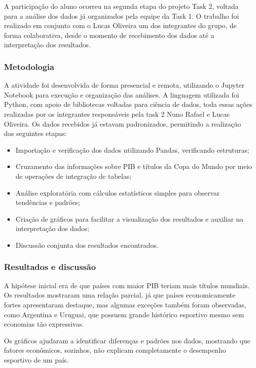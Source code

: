 \documentclass[12pt, a4paper, brazil]{article}
\begin{document}
A participação do aluno ocorreu na segunda etapa do projeto Task 2, voltada para a análise dos dados já organizados pela equipe da Task 1. O trabalho foi realizado em conjunto com o Lucas Oliveira um dos integrantes do grupo, de forma colaborativa, desde o momento de recebimento dos dados até a interpretação dos resultados.
\subsubsection{Metodologia}
A atividade foi desenvolvida de forma presencial e remota, utilizando o Jupyter Notebook para execução e organização das análises. A linguagem utilizada foi Python, com apoio de bibliotecas voltadas para ciência de dados, toda essas ações realizadas por os integrantes responsáveis pela task 2 Nuno Rafael e Lucas Oliveira. Os dados recebidos já estavam padronizados, permitindo a realização das seguintes etapas:

\begin{itemize}
\item Importação e verificação dos dados utilizando Pandas, verificando estruturas;

\item Cruzamento das informações sobre PIB e títulos da Copa do Mundo por meio de operações de integração de tabelas;

\item Análise exploratória com cálculos estatísticos simples para observar tendências e padrões;

\item Criação de gráficos para facilitar a visualização dos resultados e auxiliar na interpretação dos dados;

\item Discussão conjunta dos resultados encontrados.
\end{itemize}
\subsubsection{Resultados e discussão}
A hipótese inicial era de que países com maior PIB teriam mais títulos mundiais. Os resultados mostraram uma relação parcial, já que países economicamente fortes apresentaram destaque, mas algumas exceções também foram observadas, como Argentina e Uruguai, que possuem grande histórico esportivo mesmo sem economias tão expressivas.

Os gráficos ajudaram a identificar diferenças e padrões nos dados, mostrando que fatores econômicos, sozinhos, não explicam completamente o desempenho esportivo de um país. 
\end{document}
